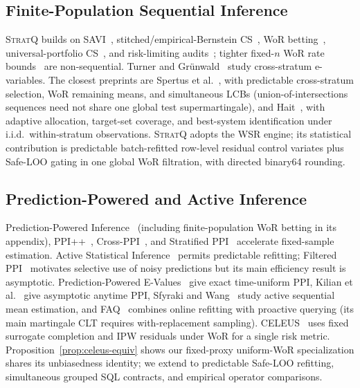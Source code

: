 \subsection{Finite-Population Sequential Inference}
\textsc{StratQ} builds on SAVI~\cite{ramdas2023savi}, stitched/empirical-Bernstein CS~\cite{howard2021cs}, WoR betting~\cite{wor2020,waudby2024betting}, universal-portfolio CS~\cite{orabona2024portfolio}, and risk-limiting audits~\cite{waudby2021rilacs}; tighter fixed-$n$ WoR rate bounds~\cite{shekhar2026rates} are non-sequential. Turner and Gr\"unwald~\cite{turner2023stratified} study cross-stratum e-variables.
The closest preprints are Spertus et al.~\cite{spertus2026sequential}, with predictable cross-stratum selection, WoR remaining means, and simultaneous LCBs (union-of-intersections sequences need not share one global test supermartingale), and Hait~\cite{hait2026target}, with adaptive allocation, target-set coverage, and best-system identification under i.i.d.\ within-stratum observations. \textsc{StratQ} adopts the WSR engine; its statistical contribution is predictable batch-refitted row-level residual control variates plus Safe-LOO gating in one global WoR filtration, with directed binary64 rounding.

\subsection{Prediction-Powered and Active Inference}
Prediction-Powered Inference~\cite{angelopoulos2023ppi} (including finite-population WoR betting in its appendix), PPI++~\cite{angelopoulos2026ppipp}, Cross-PPI~\cite{zrnic2024crossppi}, and Stratified PPI~\cite{fisch2024stratppi} accelerate fixed-sample estimation. Active Statistical Inference~\cite{zrnic2024active} permits predictable refitting; Filtered PPI~\cite{xu2026fppi} motivates selective use of noisy predictions but its main efficiency result is asymptotic.
Prediction-Powered E-Values~\cite{csillag2025evalues} give exact time-uniform PPI, Kilian et al.~\cite{kilian2025anytime} give asymptotic anytime PPI, Sfyraki and Wang~\cite{sfyraki2026active} study active sequential mean estimation, and FAQ~\cite{wu2026faq} combines online refitting with proactive querying (its main martingale CLT requires with-replacement sampling). CELEUS~\cite{zhou2026celeus} uses fixed surrogate completion and IPW residuals under WoR for a single risk metric. Proposition~\ref{prop:celeus-equiv} shows our fixed-proxy uniform-WoR specialization shares its unbiasedness identity; we extend to predictable Safe-LOO refitting, simultaneous grouped SQL contracts, and empirical operator comparisons.

